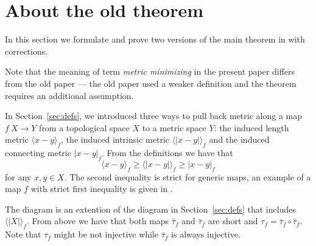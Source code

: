 \section{About the old theorem}\label{sec:old-thm}

In this section we formulate and prove two versions of the main theorem in \cite{petrunin-metric-min} with corrections.

Note that the meaning of term \emph{metric minimizing} in the present paper differs from the old paper \cite{petrunin-metric-min} --- the old paper used a weaker definition and the theorem requires an additional assumption.

In Section~\ref{sec:defs}, we introduced three ways to pull back metric along a map $f\:X\to Y$ from a topological space $X$ to a metric space $Y$: 
the induced length metric
$\langle x-y\rangle_f$,
the induced intrinsic metric $\langle| x-y|\rangle_f$
and the induced connecting metric $|x-y|_f$.
From the definitions we have that 
\[\langle x-y\rangle_f\ge \langle| x-y|\rangle_f\ge |x-y|_f\]
for any $x,y\in X$.
The second inequality is strict for generic maps, 
an example of a map $f$ with strict first inequality is given in \cite[4.2]{petrunin-intrinisic}.
\begin{figure}[h]
\centering
{}
\end{figure}
The diagram is an extention of the diagram in Section~\ref{sec:defs} that includes $\langle|X|\rangle_f$.
From above we have that both maps $\hat\tau_f$ and $\bar\tau_f$ are short and $\tau_f=\bar\tau_f\circ\hat\tau_f$.
Note that $\tau_f$ might be not injective while $\bar\tau_f$ is always injective.

